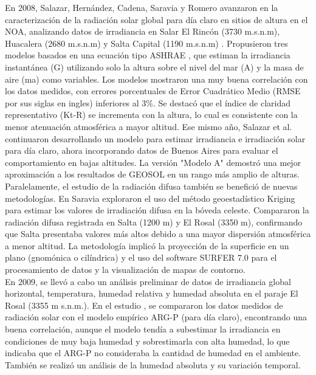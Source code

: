 En 2008, Salazar, Hernández, Cadena, Saravia y Romero avanzaron en la caracterización de la radiación solar global para día claro en sitios de altura en el NOA, analizando datos de irradiancia en Salar El Rincón (3730 m.s.n.m), Huacalera (2680 m.s.n.m) y Salta Capital (1190 m.s.n.m) \citep{Salazar2008a}. Propusieron tres modelos basados en una ecuación tipo ASHRAE \citep{MANI1980}, que estiman la irradiancia instantánea (G) utilizando solo la altura sobre el nivel del mar (A) y la masa de aire (ma) como variables. Los modelos mostraron una muy buena correlación con los datos medidos, con errores porcentuales de Error Cuadrático Medio (RMSE por sus siglas en ingles) inferiores al 3\%. Se destacó que el índice de claridad representativo (Kt-R) se incrementa con la altura, lo cual es consistente con la menor atenuación atmosférica a mayor altitud. Ese mismo año, Salazar et al. continuaron desarrollando un modelo para estimar irradiancia e irradiación solar para día claro, ahora incorporando datos de Buenos Aires para evaluar el comportamiento en bajas altitudes. La versión "Modelo A" demostró una mejor aproximación a los resultados de GEOSOL en un rango más amplio de alturas.\\

Paralelamente, el estudio de la radiación difusa también se benefició de nuevas metodologías. En \cite{Salazar2008b} Saravia exploraron el uso del método geoestadístico Kriging \citep{Krige1951}  para estimar los valores de irradiación difusa en la bóveda celeste. Compararon la radiación difusa registrada en Salta (1200 m) y El Rosal (3350 m), confirmando que Salta presentaba valores más altos debido a una mayor dispersión atmosférica a menor altitud. La metodología implicó la proyección de la superficie en un plano (gnomónica o cilíndrica) y el uso del software SURFER 7.0 para el procesamiento de datos y la visualización de mapas de contorno.\\

En 2009, se llevó a cabo un análisis preliminar de datos de irradiancia global horizontal, temperatura, humedad relativa y humedad absoluta en el paraje El Rosal (3355 m s.n.m.). En el estudio \cite{Salazar2009}, se compararon los datos medidos de radiación solar con el modelo empírico ARG-P (para día claro), encontrando una buena correlación, aunque el modelo tendía a subestimar la irradiancia en condiciones de muy baja humedad y sobrestimarla con alta humedad, lo que indicaba que el ARG-P no consideraba la cantidad de humedad en el ambiente. También se realizó un análisis de la humedad absoluta y su variación temporal.\\

